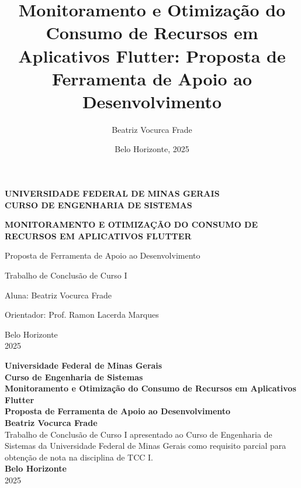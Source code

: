 \documentclass[12pt,a4paper,oneside]{abntex2}
\title{Monitoramento e Otimização do Consumo de Recursos em Aplicativos Flutter: Proposta de Ferramenta de Apoio ao Desenvolvimento}
\author{Beatriz Vocurca Frade}
\date{Belo Horizonte, 2025}
\begin{document}
\begin{titlepage}
  \centering
  {\large \textbf{UNIVERSIDADE FEDERAL DE MINAS GERAIS} \\ 
  \textbf{CURSO DE ENGENHARIA DE SISTEMAS} \par}
  \vspace{3cm}
  {\huge \textbf{MONITORAMENTO E OTIMIZAÇÃO DO CONSUMO DE RECURSOS EM APLICATIVOS FLUTTER}\par}
  \vspace{1cm}
  {\Large Proposta de Ferramenta de Apoio ao Desenvolvimento\par}
  \vfill
  {\large Trabalho de Conclusão de Curso I\par}
  \vspace{1cm}
  {\large Aluna: Beatriz Vocurca Frade\par}
  \vspace{0.5cm}
  {\large Orientador: Prof. Ramon Lacerda Marques\par}
  \vfill
  {\large Belo Horizonte \\ 2025\par}
\end{titlepage}

\newpage


\begin{center}
    \textbf{Universidade Federal de Minas Gerais} \\
    \textbf{Curso de Engenharia de Sistemas} \\
    \vspace{1.5cm}
    \textbf{\Large Monitoramento e Otimização do Consumo de Recursos em Aplicativos Flutter}\\
    \vspace{1cm}
    \textbf{Proposta de Ferramenta de Apoio ao Desenvolvimento} \\
    \vspace{2cm}
    \textbf{Beatriz Vocurca Frade} \\
    \vfill
    Trabalho de Conclusão de Curso I apresentado ao Curso de Engenharia de Sistemas da Universidade Federal de Minas Gerais como requisito parcial para obtenção de nota na disciplina de TCC I. \\
    \vspace{1.5cm}
    \textbf{Belo Horizonte} \\
    2025
\end{center}
\end{document}
